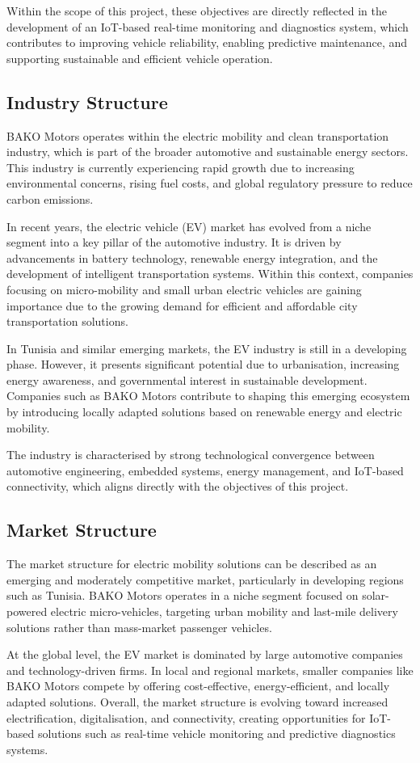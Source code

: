 Within the scope of this project, these objectives are directly reflected in the development of an IoT-based real-time monitoring and diagnostics system, which contributes to improving vehicle reliability, enabling predictive maintenance, and supporting sustainable and efficient vehicle operation.

\subsection{Industry Structure}

BAKO Motors operates within the electric mobility and clean transportation industry, which is part of the broader automotive and sustainable energy sectors. This industry is currently experiencing rapid growth due to increasing environmental concerns, rising fuel costs, and global regulatory pressure to reduce carbon emissions.

In recent years, the electric vehicle (EV) market has evolved from a niche segment into a key pillar of the automotive industry. It is driven by advancements in battery technology, renewable energy integration, and the development of intelligent transportation systems. Within this context, companies focusing on micro-mobility and small urban electric vehicles are gaining importance due to the growing demand for efficient and affordable city transportation solutions.

In Tunisia and similar emerging markets, the EV industry is still in a developing phase. However, it presents significant potential due to urbanisation, increasing energy awareness, and governmental interest in sustainable development. Companies such as BAKO Motors contribute to shaping this emerging ecosystem by introducing locally adapted solutions based on renewable energy and electric mobility.

The industry is characterised by strong technological convergence between automotive engineering, embedded systems, energy management, and IoT-based connectivity, which aligns directly with the objectives of this project.

\subsection{Market Structure}

The market structure for electric mobility solutions can be described as an emerging and moderately competitive market, particularly in developing regions such as Tunisia. BAKO Motors operates in a niche segment focused on solar-powered electric micro-vehicles, targeting urban mobility and last-mile delivery solutions rather than mass-market passenger vehicles.

At the global level, the EV market is dominated by large automotive companies and technology-driven firms. In local and regional markets, smaller companies like BAKO Motors compete by offering cost-effective, energy-efficient, and locally adapted solutions. Overall, the market structure is evolving toward increased electrification, digitalisation, and connectivity, creating opportunities for IoT-based solutions such as real-time vehicle monitoring and predictive diagnostics systems.
